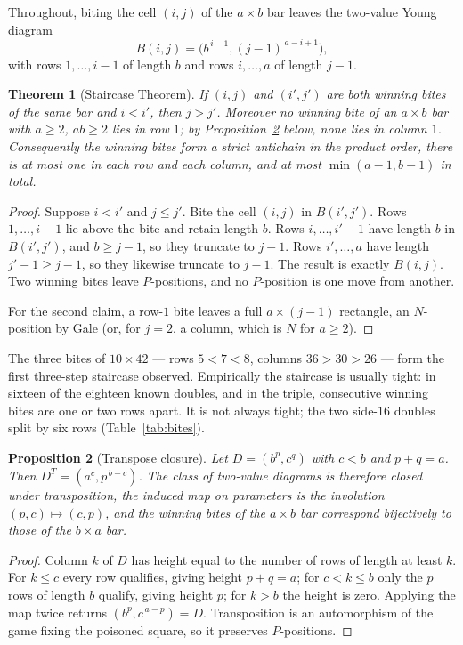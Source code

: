 \documentclass[11pt]{article}
\newtheorem{theorem}{Theorem}[section]
\newtheorem{proposition}[theorem]{Proposition}
\theoremstyle{definition}
\begin{document}
Throughout, biting the cell $(i,j)$ of the $a\times b$ bar leaves the two-value
Young diagram
\[
  B(i,j)=\bigl(b^{\,i-1},(j-1)^{\,a-i+1}\bigr),
\]
with rows $1,\dots,i-1$ of length $b$ and rows $i,\dots,a$ of length $j-1$.

\begin{theorem}[Staircase Theorem]\label{thm:stair}
If $(i,j)$ and $(i',j')$ are both winning bites of the same bar and $i<i'$,
then $j>j'$. Moreover no winning bite of an $a\times b$ bar with $a\ge2$,
$ab\ge2$ lies in row $1$; by Proposition~\ref{prop:transpose} below, none lies
in column $1$. Consequently the winning bites form a strict antichain in the
product order, there is at most one in each row and each column, and at most
$\min(a-1,b-1)$ in total.
\end{theorem}

\begin{proof}
Suppose $i<i'$ and $j\le j'$. Bite the cell $(i,j)$ in $B(i',j')$. Rows
$1,\dots,i-1$ lie above the bite and retain length $b$. Rows $i,\dots,i'-1$
have length $b$ in $B(i',j')$, and $b\ge j-1$, so they truncate to $j-1$. Rows
$i',\dots,a$ have length $j'-1\ge j-1$, so they likewise truncate to $j-1$. The
result is exactly $B(i,j)$. Two winning bites leave $P$-positions, and no
$P$-position is one move from another.

For the second claim, a row-$1$ bite leaves a full $a\times(j-1)$ rectangle, an
$N$-position by Gale (or, for $j=2$, a column, which is $N$ for $a\ge2$).
\end{proof}

The three bites of $10\times42$ --- rows $5<7<8$, columns $36>30>26$ --- form
the first three-step staircase observed. Empirically the staircase is usually
tight: in sixteen of the eighteen known doubles, and in the triple, consecutive
winning bites are one or two rows apart. It is not always tight; the two
side-$16$ doubles split by six rows (Table~\ref{tab:bites}).

\begin{proposition}[Transpose closure]\label{prop:transpose}
Let $D=(b^p,c^q)$ with $c<b$ and $p+q=a$. Then $D^{T}=(a^{c},p^{\,b-c})$. The
class of two-value diagrams is therefore closed under transposition, the
induced map on parameters is the involution $(p,c)\mapsto(c,p)$, and the
winning bites of the $a\times b$ bar correspond bijectively to those of the
$b\times a$ bar.
\end{proposition}

\begin{proof}
Column $k$ of $D$ has height equal to the number of rows of length at least
$k$. For $k\le c$ every row qualifies, giving height $p+q=a$; for $c<k\le b$
only the $p$ rows of length $b$ qualify, giving height $p$; for $k>b$ the
height is zero. Applying the map twice returns $(b^p,c^{\,a-p})=D$.
Transposition is an automorphism of the game fixing the poisoned square, so it
preserves $P$-positions.
\end{proof}
\end{document}
